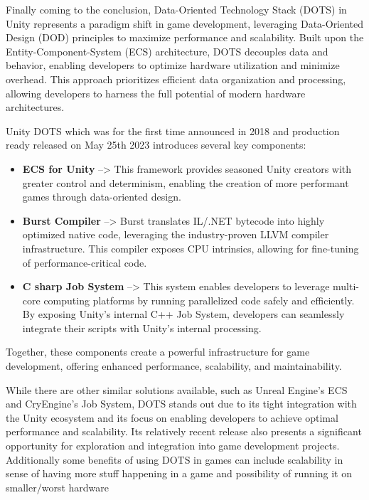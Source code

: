 Finally coming to the conclusion, Data-Oriented Technology Stack (DOTS) in Unity represents a paradigm shift in game development, leveraging Data-Oriented Design (DOD) principles to maximize performance and scalability. Built upon the Entity-Component-System (ECS) architecture, DOTS decouples data and behavior, enabling developers to optimize hardware utilization and minimize overhead. This approach prioritizes efficient data organization and processing, allowing developers to harness the full potential of modern hardware architectures.

Unity DOTS which was for the first time announced in 2018 and production ready released on May 25th 2023 introduces several key components:

\begin{itemize}
    \item \textbf{ECS for Unity} --> This framework provides seasoned Unity creators with greater control and determinism, enabling the creation of more performant games through data-oriented design.
    \item \textbf{Burst Compiler} --> Burst translates IL/.NET bytecode into highly optimized native code, leveraging the industry-proven LLVM compiler infrastructure. This compiler exposes CPU intrinsics, allowing for fine-tuning of performance-critical code.
    \item \textbf{C sharp Job System} --> This system enables developers to leverage multi-core computing platforms by running parallelized code safely and efficiently. By exposing Unity's internal C++ Job System, developers can seamlessly integrate their scripts with Unity's internal processing.
\end{itemize}

Together, these components create a powerful infrastructure for game development, offering enhanced performance, scalability, and maintainability.

While there are other similar solutions available, such as Unreal Engine's ECS and CryEngine's Job System, DOTS stands out due to its tight integration with the Unity ecosystem and its focus on enabling developers to achieve optimal performance and scalability. Its relatively recent release also presents a significant opportunity for exploration and integration into game development projects. Additionally some benefits of using DOTS in games can include scalability in sense of having more stuff happening in a game and possibility of running it on smaller/worst hardware\newline


